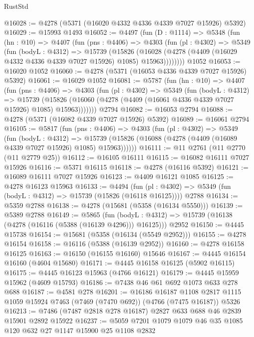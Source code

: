 \begin{lexlean}{RustStd}
\begin{coremodule}
@16028 := @4278 (@5371 (@16020 @4332 @4336 @4339 @7027 @15926) @5392)
@16029 := @15993 @1493
@16052 := @4497
    (fun (D : @1114) =>
    @5348
      (fun (hn : @10) =>
      @4407
        (fun (pns : @4406) =>
        @4303
          (fun (pl : @4302) =>
          @5349
            (fun (bodyL : @4312) =>
            @15739
              (@15826
                (@16028 (@4278 (@4409 (@16029 @4332 @4336 @4339 @7027 @15926) @1085) @15963))))))))
    @1052
@16053 := @16020 @1052
@16060 := @4278 (@5371 (@16053 @4336 @4339 @7027 @15926) @5392)
@16061 := @16029 @1052
@16081 := @5787
    (fun (hn : @10) =>
    @4407
      (fun (pns : @4406) =>
      @4303
        (fun (pl : @4302) =>
        @5349
          (fun (bodyL : @4312) =>
          @15739
            (@15826 (@16060 (@4278 (@4409 (@16061 @4336 @4339 @7027 @15926) @1085) @15963)))))))
    @2794
@16082 := @16053 @2794
@16088 := @4278 (@5371 (@16082 @4339 @7027 @15926) @5392)
@16089 := @16061 @2794
@16105 := @5817
    (fun (pns : @4406) =>
    @4303
      (fun (pl : @4302) =>
      @5349
        (fun (bodyL : @4312) =>
        @15739 (@15826 (@16088 (@4278 (@4409 (@16089 @4339 @7027 @15926) @1085) @15963))))))
@16111 := @11 @2761 (@11 @2770 (@11 @2779 @25))
@16112 := @16105 @16111
@16115 := @16082 @16111 @7027 @15926
@16116 := @5371 @16115
@16118 := @4278 (@16116 @5392)
@16121 := @16089 @16111 @7027 @15926
@16123 := @4409 @16121 @1085
@16125 := @4278 @16123 @15963
@16133 := @4494
    (fun (pl : @4302) => @5349 (fun (bodyL : @4312) => @15739 (@15826 (@16118 @16125))))
    @2788
@16134 := @5359 @2788
@16138 := @4278 (@15681 (@5358 (@16134 @5550)))
@16139 := @5389 @2788
@16149 := @5865
    (fun (bodyL : @4312) => @15739 (@16138 (@4278 (@16116 (@5388 (@16139 @4296))) @16125)))
    @2952
@16150 := @4445 @15738
@16154 := @15681 (@5358 (@16134 (@5549 @2952)))
@16155 := @4278 @16154
@16158 := @16116 (@5388 (@16139 @2952))
@16160 := @4278 @16158 @16125
@16163 := @16150 (@16155 @16160) @15646
@16167 := @4445 @16154 @16160 (@4604 @15680)
@16171 := @4445 @16158 @16125 (@5902 @16115)
@16175 := @4445 @16123 @15963 (@4766 @16121)
@16179 := @4445 @15959 @15962 (@4609 @15793)
@16186 := @7438 @46 @61 @692 @1073 @633 @278 @688
@16187 := @4581 @278
@16201 := @16186
    @16187
    @1108
    @2817
    @1115
    @1059
    @15924
    @7463
    (@7469 (@7470 @692))
    (@4766 (@7475 @16187))
    @5326
@16213 := @7486 (@7487 @2818 @278 @16187) @2827 @633 @688 @46 @2839 @15901 @2892 @15922
@16237 := @5059
    @7201
    @1079
    @1079
    @46
    @35
    @1085
    @120
    @632
    @27
    @1147
    @15900
    @25
    @1108
    @2832

\end{coremodule}
\end{lexlean}
